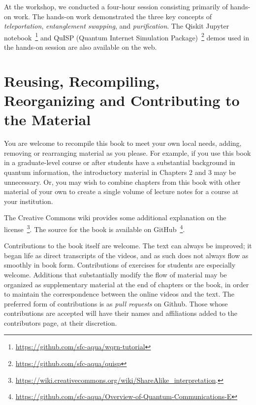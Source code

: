 At the workshop, we conducted a four-hour session consisting primarily of hands-on work.  The hands-on work demonstrated the three key concepts of \emph{teleportation}, \emph{entanglement swapping}, and \emph{purification}. The Qiskit Jupyter notebook~\footnote{\url{https://github.com/sfc-aqua/wqrn-tutorial}} and QuISP (Quantum Internet Simulation Package)~\footnote{\url{https://github.com/sfc-aqua/quisp}} demos used in the hands-on session are also available on the web. 

\section*{Reusing, Recompiling, Reorganizing and Contributing to the Material}

You are welcome to recompile this book to meet your own local needs, adding, removing or rearranging material as you please. For example, if you use this book in a graduate-level course or after students have a substantial background in quantum information, the introductory material in Chapters 2 and 3 may be unnecessary. Or, you may wish to combine chapters from this book with other material of your own to create a single volume of lecture notes for a course at your institution.

The Creative Commons wiki provides some additional explanation on the license~\footnote{\url{https://wiki.creativecommons.org/wiki/ShareAlike_interpretation}.}.  The source for the book is available on GitHub~\footnote{\url{https://github.com/sfc-aqua/Overview-of-Quantum-Communications-E}}. 

Contributions to the book itself are welcome.  The text can always be improved; it began life as direct transcripts of the videos, and as such does not always flow as smoothly in book form.  Contributions of exercises for students are especially welcome.  Additions that substantially modify the flow of material may be organized as supplementary material at the end of chapters or the book, in order to maintain the correspondence between the online videos and the text.  The preferred form of contributions is as \emph{pull requests} on Github.  Those whose contributions are accepted will have their names and affiliations added to the contributors page, at their discretion.
